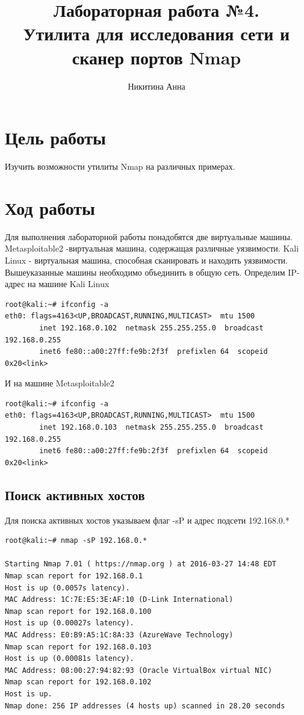 \documentclass[10pt,a4paper]{report}
\author{Никитина Анна}
\title{Лабораторная работа №4.\\
	Утилита для исследования сети и сканер портов Nmap}
\begin{document}
\maketitle
\tableofcontents
\pagebreak

\section{Цель работы}
Изучить возможности утилиты Nmap на различных примерах.
\section{Ход работы}
Для выполнения лабораторной работы понадобятся две виртуальные машины. Metasploitable2 -виртуальная машина, содержащая различные уязвимости. Kali Linux - виртуальная машина, способная сканировать и находить уязвимости. Вышеуказанные машины необходимо объединить в общую сеть.
Определим IP-адрес на машине Kali Linux 
\begin{verbatim}
root@kali:~# ifconfig -a
eth0: flags=4163<UP,BROADCAST,RUNNING,MULTICAST>  mtu 1500
        inet 192.168.0.102  netmask 255.255.255.0  broadcast 192.168.0.255
        inet6 fe80::a00:27ff:fe9b:2f3f  prefixlen 64  scopeid 0x20<link>
\end{verbatim}
И на машине Metasploitable2 
\begin{verbatim}
root@kali:~# ifconfig -a
eth0: flags=4163<UP,BROADCAST,RUNNING,MULTICAST>  mtu 1500
        inet 192.168.0.103  netmask 255.255.255.0  broadcast 192.168.0.255
        inet6 fe80::a00:27ff:fe9b:2f3f  prefixlen 64  scopeid 0x20<link>
\end{verbatim}
\subsection{Поиск активных хостов}
Для поиска активных хостов указываем флаг -sP и  адрес подсети  192.168.0.*
\begin{verbatim}
root@kali:~# nmap -sP 192.168.0.*

Starting Nmap 7.01 ( https://nmap.org ) at 2016-03-27 14:48 EDT
Nmap scan report for 192.168.0.1
Host is up (0.0057s latency).
MAC Address: 1C:7E:E5:3E:AF:10 (D-Link International)
Nmap scan report for 192.168.0.100
Host is up (0.00027s latency).
MAC Address: E0:B9:A5:1C:8A:33 (AzureWave Technology)
Nmap scan report for 192.168.0.103
Host is up (0.00081s latency).
MAC Address: 08:00:27:94:82:93 (Oracle VirtualBox virtual NIC)
Nmap scan report for 192.168.0.102
Host is up.
Nmap done: 256 IP addresses (4 hosts up) scanned in 28.20 seconds
\end{verbatim}
\end{document}
